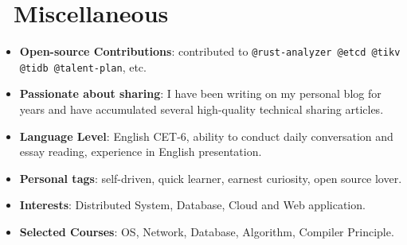 \documentclass{resume}
\newcommand{\en}[1]{#1}
\newcommand{\zh}[1]{}
\begin{document}
\section{\faInfo\ \en{Miscellaneous}\zh{杂项}}
\begin{itemize}[parsep=0.25ex]
      \item \en{\textbf{Open-source Contributions}: contributed to \texttt{@rust-analyzer @etcd @tikv @tidb @talent-plan}, etc.}
            \zh{\textbf{开源贡献}: 为 \texttt{@rust @rust-analyzer @etcd @tikv @tidb @talent-plan} 等知名开源项目组织贡献过代码}
      \item \en{\textbf{Passionate about sharing}: I have been writing on my personal blog for years and have accumulated several high-quality technical sharing articles.}
            \zh{\textbf{热爱分享}: 在个人博客上常年坚持写作，积累高质量技术分享文章数篇}
      \item \en{\textbf{Language Level}: English CET-6, ability to conduct daily conversation and essay reading, experience in English presentation.}
            \zh{\textbf{语言水平}：英语 CET-6，能够进行日常对话和论文阅读，有英文演讲经验}
      \item \en{\textbf{Personal tags}: self-driven, quick learner, earnest curiosity, open source lover.}
            \zh{\textbf{个人标签}：自驱动，学习能力强，做事认真，保持好奇，热爱开源}
      \item \en{\textbf{Interests}: Distributed System, Database, Cloud and Web application.}
            \zh{\textbf{兴趣领域}：分布式系统、数据库、云以及 Web 应用等}
      \item \en{\textbf{Selected Courses}: OS, Network, Database, Algorithm, Compiler Principle.}
            \zh{\textbf{主修课程}：操作系统、计算机网络、数据库系统原理、算法设计与分析、编译原理}
\end{itemize}
\end{document}
